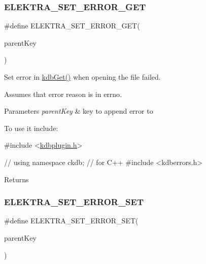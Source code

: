 \subsubsection{\texorpdfstring{E\+L\+E\+K\+T\+R\+A\+\_\+\+S\+E\+T\+\_\+\+E\+R\+R\+O\+R\+\_\+\+G\+ET}{ELEKTRA\_SET\_ERROR\_GET}}
{\footnotesize\ttfamily \#define E\+L\+E\+K\+T\+R\+A\+\_\+\+S\+E\+T\+\_\+\+E\+R\+R\+O\+R\+\_\+\+G\+ET(\begin{DoxyParamCaption}\item[{}]{parent\+Key }\end{DoxyParamCaption})}



Set error in \hyperlink{group__kdb_ga28e385fd9cb7ccfe0b2f1ed2f62453a1}{kdb\+Get()} when opening the file failed. 

Assumes that error reason is in {\ttfamily errno}.


\begin{DoxyParams}{Parameters}
{\em parent\+Key} & key to append error to\\
\hline
\end{DoxyParams}
To use it include\+:


\begin{DoxyCodeInclude}
\textcolor{preprocessor}{#include <\hyperlink{kdbplugin_8h}{kdbplugin.h}>}
\end{DoxyCodeInclude}

\begin{DoxyCodeInclude}
\textcolor{comment}{// using namespace ckdb; // for C++}
\textcolor{preprocessor}{#include <kdberrors.h>}
\end{DoxyCodeInclude}
 \begin{DoxyReturn}{Returns}

\end{DoxyReturn}
\mbox{\label{group__plugin_gaf526686f01dbacd68671732aad4b5d76}} 
\subsubsection{\texorpdfstring{E\+L\+E\+K\+T\+R\+A\+\_\+\+S\+E\+T\+\_\+\+E\+R\+R\+O\+R\+\_\+\+S\+ET}{ELEKTRA\_SET\_ERROR\_SET}}
{\footnotesize\ttfamily \#define E\+L\+E\+K\+T\+R\+A\+\_\+\+S\+E\+T\+\_\+\+E\+R\+R\+O\+R\+\_\+\+S\+ET(\begin{DoxyParamCaption}\item[{}]{parent\+Key }\end{DoxyParamCaption})}



